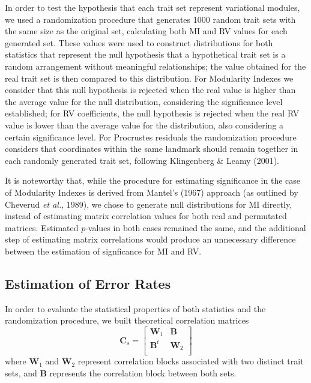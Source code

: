 \documentclass[12pt,twoside]{report}
\begin{document}
In order to test the hypothesis that each trait set represent
variational modules, we used a randomization procedure that generates
1000 random trait sets with the same size as the original set,
calculating both MI and RV values for each generated set. These values
were used to construct distributions for both statistics that represent
the null hypothesis that a hypothetical trait set is a random
arrangement without meaningful relationships; the value obtained for the
real trait set is then compared to this distribution. For Modularity
Indexes we consider that this null hypothesis is rejected when the real
value is higher than the average value for the null distribution,
considering the significance level established; for RV coefficients, the
null hypothesis is rejected when the real RV value is lower than the
average value for the distribution, also considering a certain
significance level. For Procrustes residuals the randomization procedure
considers that coordinates within the same landmark should remain
together in each randomly generated trait set, following Klingenberg \&
Leamy (2001).

It is noteworthy that, while the procedure for estimating significance
in the case of Modularity Indexes is derived from Mantel's (1967)
approach (as outlined by Cheverud \emph{et al.}, 1989), we chose to
generate null distributions for MI directly, instead of estimating
matrix correlation values for both real and permutated matrices.
Estimated $p$-values in both cases remained the same, and the additional
step of estimating matrix correlations would produce an unnecessary
difference between the estimation of signficance for MI and RV.

\subsection{Estimation of Error Rates}\label{estimation-of-error-rates}

In order to evaluate the statistical properties of both statistics and
the randomization procedure, we built theoretical correlation matrices
\[
\mathbf{C}_{s} =
\begin{bmatrix}
\mathbf{W}_1 & \mathbf{B} \\
\mathbf{B}^t & \mathbf{W}_2 \\
\end{bmatrix}
\] where $\mathbf{W}_1$ and $\mathbf{W}_2$ represent correlation blocks
associated with two distinct trait sets, and $\mathbf{B}$ represents the
correlation block between both sets.
\end{document}
